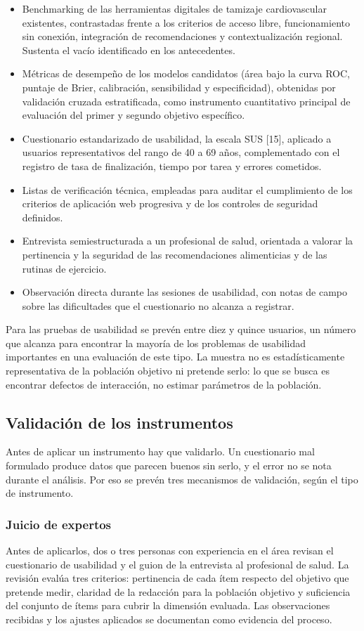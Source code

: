 \documentclass[conference]{IEEEtran}
\begin{document}
\begin{itemize}
\item Benchmarking de las herramientas digitales de tamizaje cardiovascular existentes, contrastadas frente a los criterios de acceso libre, funcionamiento sin conexión, integración de recomendaciones y contextualización regional. Sustenta el vacío identificado en los antecedentes.
\item Métricas de desempeño de los modelos candidatos (área bajo la curva ROC, puntaje de Brier, calibración, sensibilidad y especificidad), obtenidas por validación cruzada estratificada, como instrumento cuantitativo principal de evaluación del primer y segundo objetivo específico.
\item Cuestionario estandarizado de usabilidad, la escala SUS [15], aplicado a usuarios representativos del rango de 40 a 69 años, complementado con el registro de tasa de finalización, tiempo por tarea y errores cometidos.
\item Listas de verificación técnica, empleadas para auditar el cumplimiento de los criterios de aplicación web progresiva y de los controles de seguridad definidos.
\item Entrevista semiestructurada a un profesional de salud, orientada a valorar la pertinencia y la seguridad de las recomendaciones alimenticias y de las rutinas de ejercicio.
\item Observación directa durante las sesiones de usabilidad, con notas de campo sobre las dificultades que el cuestionario no alcanza a registrar.
\end{itemize}
Para las pruebas de usabilidad se prevén entre diez y quince usuarios, un número que alcanza para encontrar la mayoría de los problemas de usabilidad importantes en una evaluación de este tipo. La muestra no es estadísticamente representativa de la población objetivo ni pretende serlo: lo que se busca es encontrar defectos de interacción, no estimar parámetros de la población.

\subsection{Validación de los instrumentos}
Antes de aplicar un instrumento hay que validarlo. Un cuestionario mal formulado produce datos que parecen buenos sin serlo, y el error no se nota durante el análisis. Por eso se prevén tres mecanismos de validación, según el tipo de instrumento.

\subsubsection{Juicio de expertos}
Antes de aplicarlos, dos o tres personas con experiencia en el área revisan el cuestionario de usabilidad y el guion de la entrevista al profesional de salud. La revisión evalúa tres criterios: pertinencia de cada ítem respecto del objetivo que pretende medir, claridad de la redacción para la población objetivo y suficiencia del conjunto de ítems para cubrir la dimensión evaluada. Las observaciones recibidas y los ajustes aplicados se documentan como evidencia del proceso.
\end{document}

